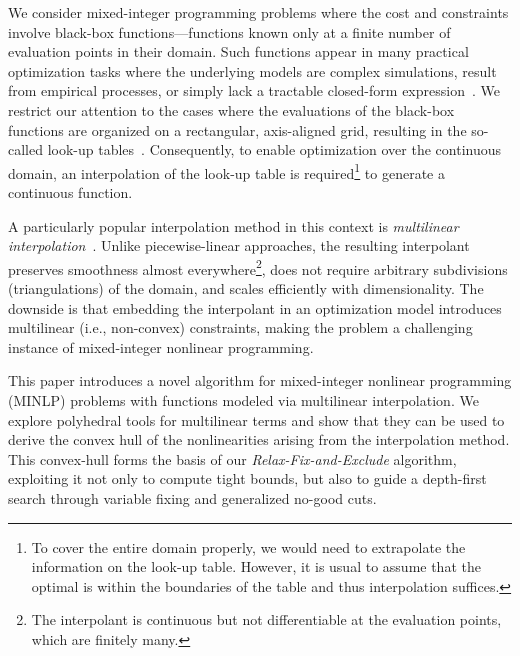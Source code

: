 \documentclass[pdflatex,sn-mathphys-num]{sn-jnl}%
\newcommand{\new}[1]{#1}
\begin{document}
\new{%
We consider mixed-integer programming problems where the cost and constraints involve black-box functions---functions known only at a finite number of evaluation points in their domain.
Such functions appear in many practical optimization tasks where the underlying models are complex simulations, result from empirical processes, or simply lack a tractable closed-form expression~\cite{jonesEfficientGlobalOptimization1998,bischlHyperparameterOptimizationFoundations2023,shieldsBayesianReactionOptimization2021,raoEngineeringOptimizationTheory2019a}.
We restrict our attention to the cases where the evaluations of the black-box functions are organized on a rectangular, axis-aligned grid, resulting in the so-called look-up tables~\citep{epelleComputationalPerformanceComparison2020a,grimstadGlobalOptimizationMultiphase2016}.
Consequently, to enable optimization over the continuous domain, an interpolation of the look-up table is required\footnote{To cover the entire domain properly, we would need to extrapolate the information on the look-up table. However, it is usual to assume that the optimal is within the boundaries of the table and thus interpolation suffices.} to generate a continuous function.
}

\new{%
A particularly popular interpolation method in this context is \emph{multilinear interpolation}~\citep{gastellu-etchegorryInterpolationProcedureGeneralizing2003,piniConsistentLookupTable2015,nellesGridBasedLookUpTable2000,nellesLinearPolynomialLookUp2020,bohnOptimizationbasedApproachCalibration2006a,guptaMonotonicCalibratedInterpolated2016,furlanSimpleApproachImprove2016,martinsImplementationMultilinearLookup2020}.
Unlike piecewise-linear approaches, the resulting interpolant preserves smoothness almost everywhere\footnote{The interpolant is continuous but not differentiable at the evaluation points, which are finitely many.}, does not require arbitrary subdivisions (triangulations) of the domain, and scales efficiently with dimensionality.
The downside is that embedding the interpolant in an optimization model introduces multilinear (i.e., non-convex) constraints, making the problem a challenging instance of mixed-integer nonlinear programming.
}

\new{%
This paper introduces a novel algorithm for mixed-integer nonlinear programming (MINLP) problems with functions modeled via multilinear interpolation.
We explore polyhedral tools for multilinear terms and show that they can be used to derive the convex hull of the nonlinearities arising from the interpolation method.
This convex-hull forms the basis of our \emph{Relax-Fix-and-Exclude} algorithm, exploiting it not only to compute tight bounds, but also to guide a depth-first search through variable fixing and generalized no-good cuts.
}
\end{document}

